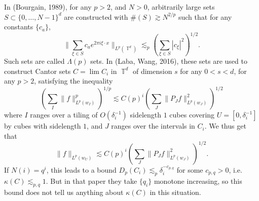 \documentclass[dvipsnames,letterpaper,12pt]{article}
\numberwithin{equation}{section}
\DeclareMathOperator{\TT}{\mathbb{T}}
\numberwithin{theorem}{section}
\begin{document}
In (Bourgain, 1989), for any $p > 2$, and $N > 0$, arbitrarily large sets $S \subset \{ 0, \dots, N-1 \}^d$ are constructed with $\#(S) \gtrsim N^{2/p}$ such that for any constants $\{ c_a \}$,
%
\[ \| \sum_{\xi \in S} c_a e^{2 \pi i \xi \cdot x} \|_{L^p(\TT^d)} \lesssim_p \left( \sum_{\xi \in S} |c_\xi|^2 \right)^{1/2}. \]
%
Such sets are called $\Lambda(p)$ sets. In (Laba, Wang, 2016), these sets are used to construct Cantor sets $C = \lim C_i$ in $\TT^d$ of dimension $s$ for any $0 < s < d$, for any $p > 2$, satisfying the inequality
%
\[ \left( \sum_I \| f \|_{L^p(w_I)}^p \right)^{1/p} \lesssim C(p)^i \left( \sum_J \| P_J f \|_{L^p(w_J)}^2 \right)^{1/2} \]
%
where $I$ ranges over a tiling of $O(\delta_i^{-1})$ sidelength $1$ cubes covering $U = [0,\delta_i^{-1}]$ by cubes with sidelength $1$, and $J$ ranges over the intervals in $C_i$. We thus get that
%
\[ \| f \|_{L^p(w_U)} \lesssim C(p)^i \left( \sum_J \| P_J f \|_{L^p(w_J)}^2 \right)^{1/2}. \]
%
If $N(i) = q^i$, this leads to a bound $D_p(C_i) \lesssim_p \delta_i^{-c_{p,q}}$ for some $c_{p,q} > 0$, i.e. $\kappa(C) \lesssim_{p,q} 1$. But in that paper they take $\{ q_i \}$ monotone increasing, so this bound does not tell us anything about $\kappa(C)$ in this situation.
\end{document}
